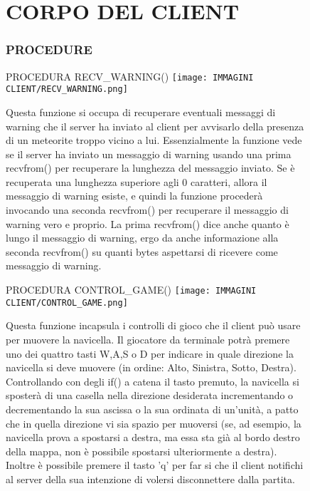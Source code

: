 \documentclass{article}
\begin{document}
    \begin{enumerate}
    \begin{figure}[!htb]
    \part{CORPO DEL CLIENT}
    \section{PROCEDURE}
    \item PROCEDURA RECV\_WARNING()
        \centering
        \texttt{[image: IMMAGINI CLIENT/RECV\_WARNING.png]}
        \raggedright\par
        Questa funzione si occupa di recuperare eventuali messaggi di warning che il server ha inviato al client per avvisarlo della presenza di un meteorite troppo vicino a lui.
        Essenzialmente la funzione vede se il server ha inviato un messaggio di warning usando una prima recvfrom() per recuperare la lunghezza del messaggio inviato. \newline
        Se è recuperata una lunghezza superiore agli 0 caratteri, allora il messaggio di warning esiste, e quindi la funzione procederà invocando una seconda recvfrom() per recuperare il messaggio di warning vero e proprio. \newline 
        La prima recvfrom() dice anche quanto è lungo il messaggio di warning, ergo da anche informazione alla seconda recvfrom() su quanti bytes aspettarsi di ricevere come messaggio di warning.
    \end{figure}

    \begin{figure}[!htb]
    \item PROCEDURA CONTROL\_GAME()
        \centering
        \texttt{[image: IMMAGINI CLIENT/CONTROL\_GAME.png]}
        \raggedright\par
        Questa funzione incapsula i controlli di gioco che il client può usare per muovere la navicella. Il giocatore da terminale potrà premere uno dei quattro tasti W,A,S o D per indicare in quale direzione la navicella si deve muovere (in ordine: Alto, Sinistra, Sotto, Destra). \newline
        Controllando con degli if() a catena il tasto premuto, la navicella si sposterà di una casella nella direzione desiderata incrementando o decrementando la sua ascissa o la sua ordinata di un'unità, a patto che in quella direzione vi sia spazio per muoversi (se, ad esempio, la navicella prova a spostarsi a destra, ma essa sta già al bordo destro della mappa, non è possibile spostarsi ulteriormente a destra). \newline
        Inoltre è possibile premere il tasto 'q' per far si che il client notifichi al server della sua intenzione di volersi disconnettere dalla partita.
    \end{figure}


\end{enumerate}
\end{document}
